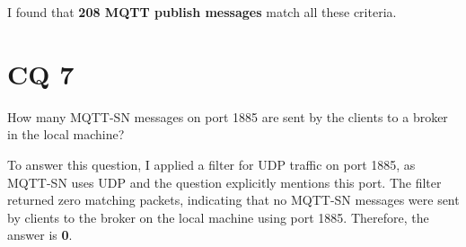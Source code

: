 \documentclass{Configuration_Files/PoliMi3i_thesis}
\begin{document}
I found that \textbf{208 MQTT publish messages} match all these criteria.



\chapter{CQ 7}
\begin{tcolorbox}[questionbox]
    How many MQTT-SN messages on port 1885 are sent by the clients to a broker in the local machine?
\end{tcolorbox}

To answer this question, I applied a filter for UDP traffic on port 1885, as MQTT-SN uses UDP and the question explicitly mentions this port. The filter returned zero matching packets, indicating that no MQTT-SN messages were sent by clients to the broker on the local machine using port 1885. Therefore, the answer is \textbf{0}.


\cleardoublepage
\end{document}
